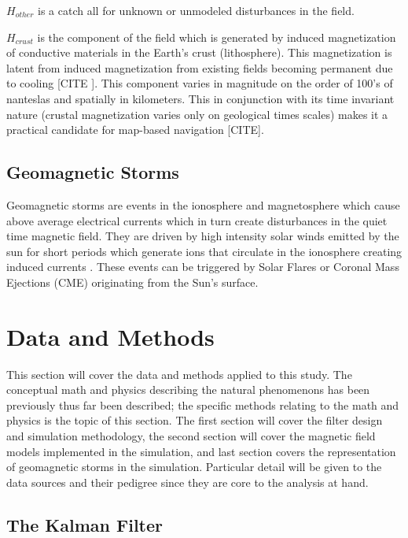 \documentclass[conf]{new-aiaa}
\begin{document}
\(H_{other}\) is a catch all for unknown or unmodeled disturbances in the field.

\(H_{crust}\) is the component of the field which is generated by induced magnetization of conductive materials in the Earth's crust (lithosphere). This magnetization is latent from induced magnetization from existing fields becoming permanent due to cooling [CITE ]. This component varies in magnitude on the order of 100's of nanteslas and spatially in kilometers. This in conjunction with its time invariant nature (crustal magnetization varies only on geological times scales) makes it a practical candidate for map-based navigation [CITE].  

\subsection{Geomagnetic Storms} %

Geomagnetic storms are events in the ionosphere and magnetosphere which cause above average electrical currents which in turn create disturbances in the quiet time magnetic field. They are driven by high intensity solar winds emitted by the sun for short periods which generate ions that circulate in the ionosphere creating induced currents \cite{Physics_of_the_Earths_Space_Environment}. These events can be triggered by Solar Flares or Coronal Mass Ejections (CME) originating from the Sun's surface.

\section{Data and Methods} %

This section will cover the data and methods applied to this study. The conceptual math and physics describing the natural phenomenons has been previously thus far been described; the specific methods relating to the math and physics is the topic of this section. The first section will cover the filter design and simulation methodology, the second section will cover the magnetic field models implemented in the simulation, and last section covers the representation of geomagnetic storms in the simulation. Particular detail will be given to the data sources and their pedigree since they are core to the analysis at hand.

\subsection{The Kalman Filter} %
\end{document}
